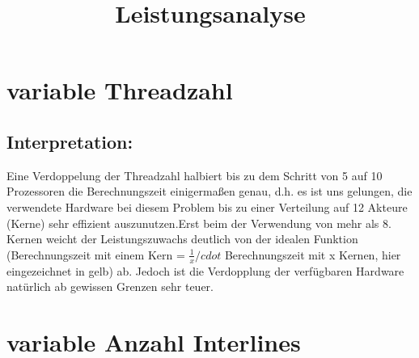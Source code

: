 \documentclass[fleqn]{article}
\title{Leistungsanalyse}
\begin{document}
\section{variable Threadzahl}

\subsection{Interpretation:}
Eine Verdoppelung der Threadzahl halbiert bis zu dem Schritt von 5 auf 10 Prozessoren die Berechnungszeit einigermaßen genau, d.h. es ist uns gelungen, die verwendete Hardware bei diesem Problem bis zu einer Verteilung auf 12 Akteure (Kerne) sehr effizient auszunutzen.Erst beim der Verwendung von mehr als 8. Kernen weicht der Leistungszuwachs deutlich von der idealen Funktion (Berechnungszeit mit einem Kern = $\frac{1}{x} /cdot $ Berechnungszeit mit x Kernen, hier eingezeichnet in gelb) ab.
Jedoch ist die Verdopplung der verfügbaren Hardware natürlich ab gewissen Grenzen sehr teuer.



\section{variable Anzahl Interlines}
\end{document}
